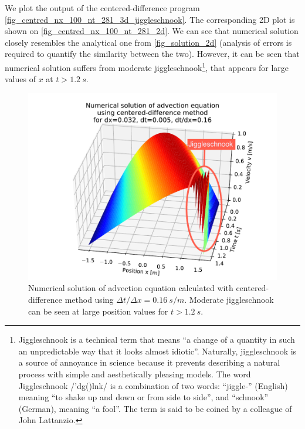 We plot the output of the centered-difference program \autoref{fig_centred_nx_100_nt_281_3d_jiggleschnook}. The corresponding 2D plot is shown on \autoref{fig_centred_nx_100_nt_281_2d}. We can see that numerical solution closely resembles the analytical one from \autoref{fig_solution_2d} (analysis of errors is required to quantify the similarity between the two). However, it can be seen that numerical solution suffers from moderate jiggleschnook\footnote{Jiggleschnook is a technical term that means ``a change of a quantity in such an unpredictable way that it looks almost idiotic''.  Naturally, jiggleschnook is a source of annoyance in science because it prevents describing a natural process with simple and aesthetically pleasing models. The word Jiggleschnook /'d\textyogh\textsci g(\textschwa)l\textesh n\textupsilon k/ is a combination of two words: ``jiggle-'' (English) meaning ``to shake up and down or from side to side'', and ``schnook'' (German), meaning ``a fool''. The term is said to be coined by a colleague of John Lattanzio.}, that appears for large values of $x$ at $t > 1.2 \ s$.
\begin{figure}[H]
  \vspace*{-5mm}
  \centering
  \includegraphics[width=1.0\textwidth]{figures/numerical/centred_nx_100_nt_281_3d_jiggleschnook_flat.pdf}
  \vspace*{-10mm}
  \caption{Numerical solution of advection equation calculated with centered-difference method using $\Delta t / \Delta x = 0.16 \ s/m$. Moderate jiggleschnook can be seen at large position values for $t > 1.2 \ s$.}
  \label{fig_centred_nx_100_nt_281_3d_jiggleschnook}
  \vspace*{-10mm}
\end{figure}
